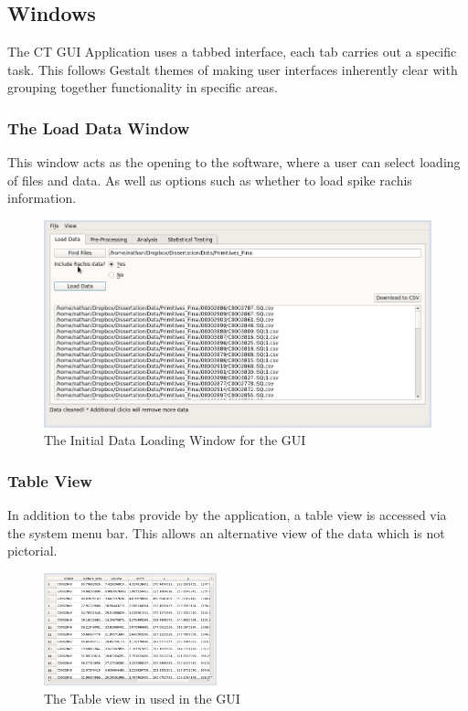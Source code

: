 \documentclass[11pt]{report}
\begin{document}
\subsection{Windows}
\label{sec:orgc2dafc5}
The CT GUI Application uses a tabbed interface, each tab carries out a specific task. This follows Gestalt themes of making user interfaces inherently clear with grouping together functionality in specific areas.

\subsubsection{The Load Data Window}
\label{sec:org3a69ecc}
This window acts as the opening to the software, where a user can select loading of files and data. As well as options such as whether to load spike rachis information.
\begin{figure}[htbp]
\centering
\includegraphics[width=11.5cm]{./images/Screenshots/clean_data_remove_large.png}
\caption{\label{fig:org9e7feb5}
The Initial Data Loading Window for the GUI}
\end{figure}
\subsubsection{Table View}
\label{sec:org3f330df}
In addition to the tabs provide by the application, a table view is accessed via the system menu bar. This allows an alternative view of the data which is not pictorial.
\begin{figure}[htbp]
\centering
\includegraphics[width=5cm]{./images/table.png}
\caption{\label{fig:orgd2ffd24}
The Table view in used in the GUI}
\end{figure}
\end{document}
